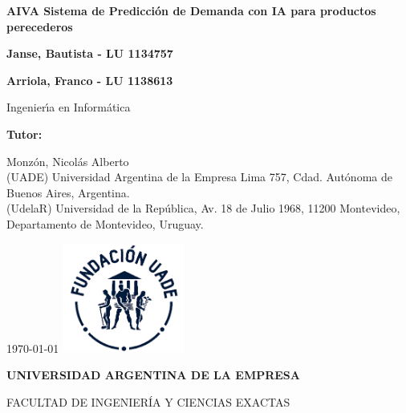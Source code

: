 \begin{titlepage} %

    \centering
    {\textbf{\fontsize{16}{17}\selectfont AIVA Sistema de Predicción de Demanda con IA para productos perecederos
    } \par}
    \vspace{1cm}
    {\textbf{\fontsize{16}{17}\selectfont Janse, Bautista - LU 1134757} \par}
    {\textbf{\fontsize{16}{17}\selectfont Arriola, Franco - LU 1138613} \par}
    \vspace{1.5cm}
    {\fontsize{16}{17}\selectfont Ingenier\'{\i}a en Inform\'atica \par}
    \vspace{1cm}
    {\textbf{\fontsize{14}{14}\selectfont Tutor:} \par}
    {\fontsize{14}{14}\selectfont Monzón, Nicolás Alberto
        \\ (UADE) Universidad Argentina de la Empresa Lima 757, Cdad. Autónoma de Buenos Aires, Argentina.
        \\ (UdelaR) Universidad de la República, Av. 18 de Julio 1968, 11200 Montevideo, Departamento de Montevideo, Uruguay.
        \par}
    \vspace{1cm}
    \vfill
    \today
    \vfill
    \includegraphics[width=0.30\textwidth]{./images/UADE}\par \vspace{1cm}
    {\textbf{\fontsize{14}{14}\selectfont UNIVERSIDAD ARGENTINA DE LA EMPRESA} \par}
    {\fontsize{14}{14}\selectfont FACULTAD DE INGENIER\'IA Y CIENCIAS EXACTAS \par}

\end{titlepage}
